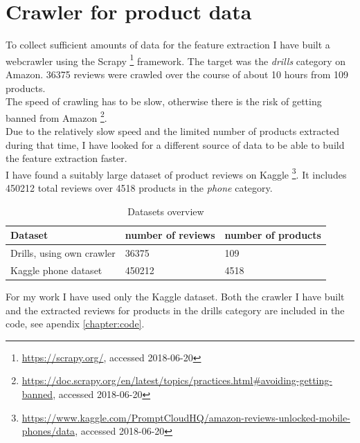 \section{Crawler for product data}
To collect sufficient amounts of data for the feature extraction I have built a webcrawler using the Scrapy \footnote{\url{https://scrapy.org/}, accessed 2018-06-20} framework. The target was the \textit{drills} category on Amazon. 36375 reviews were crawled over the course of about 10 hours from 109 products.\\
The speed of crawling has to be slow, otherwise there is the risk of getting banned from Amazon \footnote{\url{https://doc.scrapy.org/en/latest/topics/practices.html\#avoiding-getting-banned}, accessed 2018-06-20}.\\
Due to the relatively slow speed and the limited number of products extracted during that time, I have looked for a different source of data to be able to build the feature extraction faster.\\
I have found a suitably large dataset of product reviews on Kaggle \footnote{\url{https://www.kaggle.com/PromptCloudHQ/amazon-reviews-unlocked-mobile-phones/data}, accessed 2018-06-20}. It includes 450212 total reviews over 4518 products in the \textit{phone} category.

\begin{table}[H]
\centering
\caption{Datasets overview}
\label{table:datasets}
    \begin{tabular}{l|l|l}
    Dataset & number of reviews & number of products \\ \hline
    Drills, using own crawler & 36375 & 109 \\ \hline
    Kaggle phone dataset  & 450212 & 4518 
    \end{tabular}
\end{table}

For my work I have used only the Kaggle dataset. Both the crawler I have built and the extracted reviews for products in the drills category are included in the code, see apendix \ref{chapter:code}.

